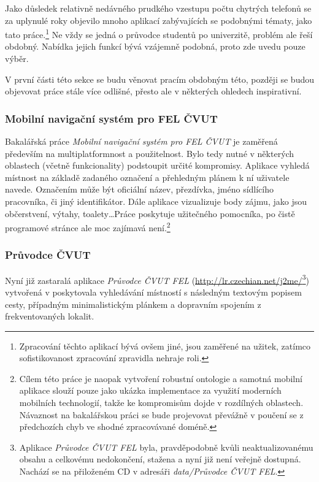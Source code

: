 Jako důsledek relativně nedávného prudkého vzestupu počtu chytrých telefonů se za uplynulé roky objevilo mnoho aplikací zabývajících se podobnými tématy, jako tato práce.\footnote{Zpracování těchto aplikací bývá ovšem jiné, jsou zaměřené na užitek, zatímco sofistikovanost zpracování zpravidla nehraje roli.} Ne vždy se jedná o průvodce studentů po univerzitě, problém ale řeší obdobný. Nabídka jejich funkcí bývá vzájemně podobná, proto zde uvedu pouze výběr.

V první části této sekce se budu věnovat pracím obdobným této, později se budou objevovat práce stále více odlišné, přesto ale v některých ohledech inspirativní.

\subsubsection{Mobilní navigační systém pro FEL ČVUT}
Bakalářská práce \emph{Mobilní navigační systém pro FEL ČVUT} \cite{Bakalarka} je zaměřená především na multiplatformnost a použitelnost. Bylo tedy nutné v některých oblastech (včetně funkcionality) podstoupit určité kompromisy. Aplikace vyhledá místnost na základě zadaného označení a přehledným plánem k ní uživatele navede. Označením může být oficiální název, přezdívka, jméno sídlícího pracovníka, či jiný identifikátor. Dále aplikace vizualizuje body zájmu, jako jsou občerstvení, výtahy, toalety\dots Práce poskytuje užitečného pomocníka, po čistě programové stránce ale moc zajímavá není.\footnote{Cílem této práce je naopak vytvoření robustní ontologie a samotná mobilní aplikace slouží pouze jako ukázka implementace za využití moderních mobilních technologií, takže ke kompromisům dojde v rozdílných oblastech. Návaznost na bakalářskou práci se bude projevovat převážně v poučení se z předchozích chyb ve shodné zpracovávané doméně.}

\subsubsection{Průvodce ČVUT}
Nyní již zastaralá aplikace \emph{Průvodce ČVUT FEL} (\url{http://lr.czechian.net/j2me/}\footnote{Aplikace \emph{Průvodce ČVUT FEL} byla, pravděpodobně kvůli neaktualizovanému obsahu a celkovému nedokončení, stažena a nyní již není veřejně dostupná. Nachází se na přiloženém \gls{CD} v adresáři \textit{data/Průvodce ČVUT FEL}.}) vytvořená v  poskytovala vyhledávání místností s následným textovým popisem cesty, případným minimalistickým plánkem a dopravním spojením z frekventovaných lokalit.

